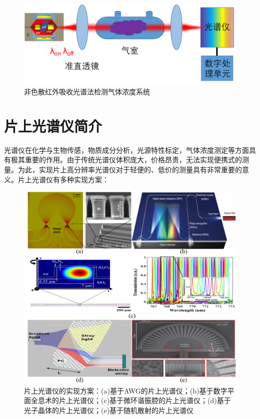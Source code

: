 \begin{figure}[htb]
	\centering
	\includegraphics[width=14cm]{./Pictures/edg_gas_equipment.jpg}
	\captionsetup{justification=centering}
	\caption{非色散红外吸收光谱法检测气体浓度系统}
	\label{edg_gas_equipment}
\end{figure}

\section{片上光谱仪简介}
光谱仪在化学与生物传感，物质成分分析，光源特性标定，气体浓度测定等方面具有极其重要的作用\cite{redding2013compact}。由于传统光谱仪体积庞大，价格昂贵，无法实现便携式的测量。为此，实现片上高分辨率光谱仪对于轻便的、低价的测量具有非常重要的意义。片上光谱仪有多种实现方案：

\begin{figure}[htb]
	\centering
	\includegraphics[width=15cm]{./Pictures/edg_background.jpg}
	\captionsetup{justification=centering}
	\caption{片上光谱仪的实现方案：(a)基于AWG的片上光谱仪\cite{cheben2007high}；(b)基于数字平面全息术的片上光谱仪；(c)基于微环谐振腔的片上光谱仪\cite{fan2018highly}；(d)基于光子晶体的片上光谱仪\cite{momeni2009integrated}；(e)基于随机散射的片上光谱仪\cite{redding2013compact}}
	\label{edg_background}
\end{figure}

